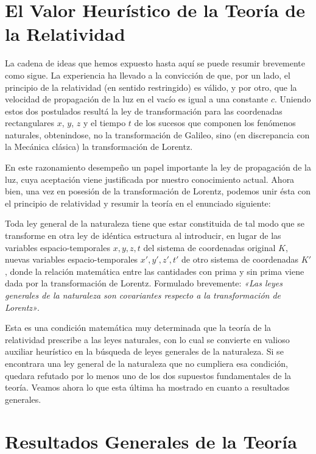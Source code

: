\documentclass[spanish]{book}
\begin{document}
\chapter{El Valor Heurístico de la Teoría de la Relatividad}

La cadena de ideas que hemos expuesto hasta aquí se puede resumir brevemente
como sigue. La experiencia ha llevado a la convicción de que, por un lado, el principio
de la relatividad (en sentido restringido) es válido, y por otro, que la velocidad de
propagación de la luz en el vacío es igual a una constante $c$. Uniendo estos dos
postulados resultá la ley de transformación para las coordenadas rectangulares $x$, $y$, $z$ y
el tiempo $t$ de los sucesos que componen los fenómenos naturales, obtenindose, no la
transformación de Galileo, sino (en discrepancia con la Mecánica clásica) la
transformación de Lorentz.

En este razonamiento desempeño un papel importante la ley de propagación de la
luz, cuya aceptación viene justificada por nuestro conocimiento actual. Ahora bien,
una vez en posesión de la transformación de Lorentz, podemos unir ésta con el
principio de relatividad y resumir la teoría en el enunciado siguiente:

Toda ley general de la naturaleza tiene que estar constituida de tal modo que se
transforme en otra ley de idéntica estructura al introducir, en lugar de las variables
espacio-temporales $x, y, z, t$ del sistema de coordenadas original $K$, nuevas variables
espacio-temporales $x', y', z', t'$ de otro sistema de coordenadas $K'$, donde la relación
matemática entre las cantidades con prima y sin prima viene dada por la
transformación de Lorentz. Formulado brevemente: \textit{«Las leyes generales de la naturaleza
son covariantes respecto a la transformación de Lorentz»}.

Esta es una condición matemática muy determinada que la teoría de la relatividad
prescribe a las leyes naturales, con lo cual se convierte en valioso auxiliar heurístico en
la búsqueda de leyes generales de la naturaleza. Si se encontrara una ley general de
la naturaleza que no cumpliera esa condición, quedara refutado por lo menos uno de
los dos supuestos fundamentales de la teoría. Veamos ahora lo que esta última ha
mostrado en cuanto a resultados generales.


\chapter{Resultados Generales de la Teoría}
\end{document}
